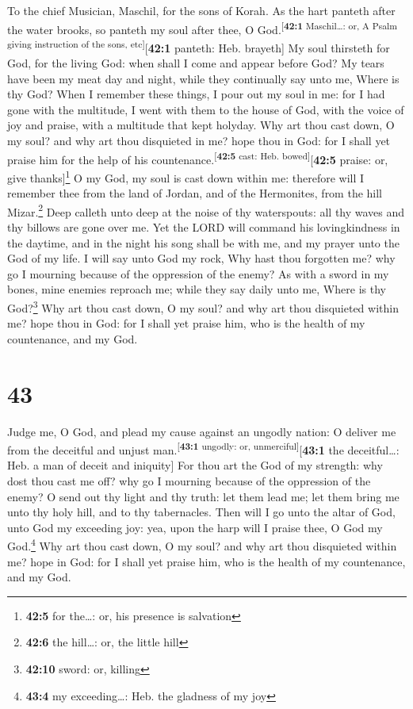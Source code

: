 To the chief Musician, Maschil, for the sons of Korah.  As
the hart panteth after the water brooks, so panteth my soul after thee,
O God.\textsuperscript{{[}\textbf{42:1} Maschil\ldots: or, A Psalm
giving instruction of the sons, etc{]}}{[}\textbf{42:1} panteth: Heb.
brayeth{]}  My soul thirsteth for God, for the living God:
when shall I come and appear before God?  My tears have
been my meat day and night, while they continually say unto me, Where is
thy God?  When I remember these things, I pour out my soul
in me: for I had gone with the multitude, I went with them to the house
of God, with the voice of joy and praise, with a multitude that kept
holyday.  Why art thou cast down, O my soul? and why art
thou disquieted in me? hope thou in God: for I shall yet praise him for
the help of his countenance.\textsuperscript{{[}\textbf{42:5} cast: Heb.
bowed{]}}{[}\textbf{42:5} praise: or, give thanks{]}\footnote{\textbf{42:5}
  for the\ldots: or, his presence is salvation}  O my God,
my soul is cast down within me: therefore will I remember thee from the
land of Jordan, and of the Hermonites, from the hill Mizar.\footnote{\textbf{42:6}
  the hill\ldots: or, the little hill}  Deep calleth unto
deep at the noise of thy waterspouts: all thy waves and thy billows are
gone over me.  Yet the LORD will command his
lovingkindness in the daytime, and in the night his song shall be with
me, and my prayer unto the God of my life.  I will say
unto God my rock, Why hast thou forgotten me? why go I mourning because
of the oppression of the enemy?  As with a sword in my
bones, mine enemies reproach me; while they say daily unto me, Where is
thy God?\footnote{\textbf{42:10} sword: or, killing}  Why
art thou cast down, O my soul? and why art thou disquieted within me?
hope thou in God: for I shall yet praise him, who is the health of my
countenance, and my God.

\hypertarget{section-42}{%
\section{43}\label{section-42}}

 Judge me, O God, and plead my cause against an ungodly
nation: O deliver me from the deceitful and unjust
man.\textsuperscript{{[}\textbf{43:1} ungodly: or,
unmerciful{]}}{[}\textbf{43:1} the deceitful\ldots: Heb. a man of deceit
and iniquity{]}  For thou art the God of my strength: why
dost thou cast me off? why go I mourning because of the oppression of
the enemy?  O send out thy light and thy truth: let them
lead me; let them bring me unto thy holy hill, and to thy tabernacles.
 Then will I go unto the altar of God, unto God my
exceeding joy: yea, upon the harp will I praise thee, O God my
God.\footnote{\textbf{43:4} my exceeding\ldots: Heb. the gladness of my
  joy}  Why art thou cast down, O my soul? and why art
thou disquieted within me? hope in God: for I shall yet praise him, who
is the health of my countenance, and my God.

